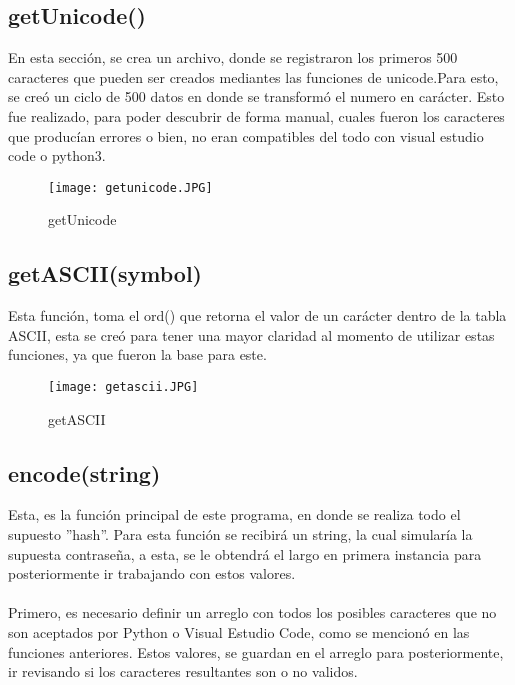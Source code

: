 \documentclass{article}
\begin{document}
\subsection{getUnicode()}
En esta sección, se crea un archivo, donde se registraron los primeros 500 caracteres que pueden ser creados mediantes las funciones de unicode.Para esto, se creó un ciclo de 500 datos en donde se transformó el numero en carácter.
\newline \newline
Esto fue realizado, para poder descubrir de forma manual, cuales fueron los caracteres que producían errores o bien, no eran compatibles del todo con visual estudio code o python3. 

\begin{figure}[h!]
    \centering
    \texttt{[image: getunicode.JPG]}
    \caption{getUnicode}
    \label{fig:my_label}
\end{figure}

\subsection{getASCII(symbol)}
Esta función, toma el ord() que retorna el valor de un carácter dentro de la tabla ASCII, esta se creó para tener una mayor claridad al momento de utilizar estas funciones, ya que fueron la base para este.

\begin{figure}[h!]
    \centering
    \texttt{[image: getascii.JPG]}
    \caption{getASCII}
    \label{fig:my_label}
\end{figure}
\newpage
\subsection{encode(string)}
Esta, es la función principal de este programa, en donde se realiza todo el supuesto ''hash''. Para esta función se recibirá un string, la cual simularía la supuesta contraseña, a esta, se le obtendrá el largo en primera instancia para posteriormente ir trabajando con estos valores.
\\\\
Primero, es necesario definir un arreglo con todos los posibles caracteres que no son aceptados por Python o Visual Estudio Code, como se mencionó en las funciones anteriores. Estos valores, se guardan en el arreglo para posteriormente, ir revisando si los caracteres resultantes son o no validos.
\end{document}
